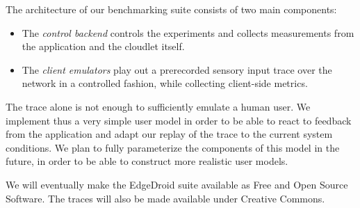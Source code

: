 \documentclass[portrait, a1]{KTHEEposter}
\begin{document}
\begin{pcolumns}[3]
\begin{pcolumn}[3]
\begin{pframe}[1.4]
                The architecture of our benchmarking suite consists of two main components:
                \begin{itemize}
                    \item The \emph{control backend} controls the experiments and collects measurements from the application and the cloudlet itself.
                    \item The \emph{client emulators} play out a prerecorded sensory input trace over the network in a controlled fashion, while collecting client-side metrics.
                \end{itemize}
            \end{pframe}
            \begin{pframe}[1.36]
                \begin{center}
                    \medskip
                    
                    \medskip
                \end{center}
                The trace alone is not enough to sufficiently emulate a human user.
                We implement thus a very simple user model in order to be able to react to feedback from the application and adapt our replay of the trace to the current system conditions.
                We plan to fully parameterize the components of this model in the future, in order to be able to construct more realistic user models.
            \end{pframe}
            \begin{pframe}[.24]
                We will eventually make the EdgeDroid suite available as Free and Open Source Software.
                The traces will also be made available under Creative Commons.
            \end{pframe}            
        \end{pcolumn}%
        \begin{pcolumn}[2]
            \begin{pframe}[1.27]

\end{pframe}
\end{pcolumn}
\end{pcolumns}
\end{document}
